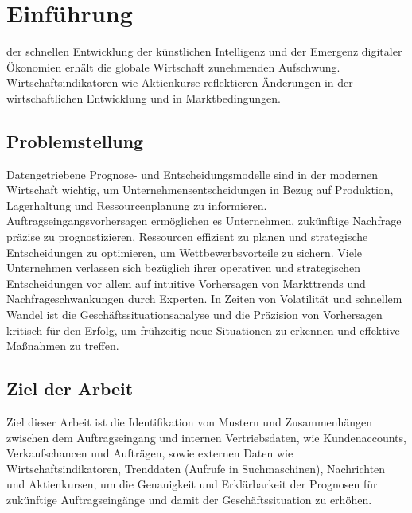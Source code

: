 \documentclass[lettersize,journal]{IEEEtran}
\begin{document}
\section{Einführung}
 der schnellen Entwicklung der künstlichen Intelligenz und der Emergenz digitaler Ökonomien erhält die globale Wirtschaft zunehmenden Aufschwung. Wirtschaftsindikatoren wie Aktienkurse reflektieren Änderungen in der wirtschaftlichen Entwicklung und in Marktbedingungen. 

\subsection*{Problemstellung}
Datengetriebene Prognose- und Entscheidungsmodelle sind in der modernen Wirtschaft wichtig, um Unternehmensentscheidungen in Bezug auf Produktion, Lagerhaltung und Ressourcenplanung zu informieren. %
Auftragseingangsvorhersagen ermöglichen es Unternehmen, zukünftige Nachfrage präzise zu prognostizieren, Ressourcen effizient zu planen und strategische Entscheidungen zu optimieren, um Wettbewerbsvorteile zu sichern. 
Viele Unternehmen verlassen sich bezüglich ihrer operativen und strategischen Entscheidungen vor allem auf intuitive Vorhersagen von Markttrends und Nachfrageschwankungen durch Experten. In Zeiten von Volatilität und schnellem Wandel ist die Geschäftssituationsanalyse und die Präzision von Vorhersagen kritisch für den Erfolg, um frühzeitig neue Situationen zu erkennen und effektive Maßnahmen zu treffen.
\subsection*{Ziel der Arbeit}
Ziel dieser Arbeit ist die Identifikation von Mustern und Zusammenhängen zwischen dem Auftragseingang und internen Vertriebsdaten, wie Kundenaccounts, Verkaufschancen und Aufträgen, sowie externen Daten wie Wirtschaftsindikatoren, Trenddaten (Aufrufe in Suchmaschinen), Nachrichten und Aktienkursen, um die Genauigkeit und Erklärbarkeit der Prognosen für zukünftige Auftragseingänge und damit der Geschäftssituation zu erhöhen.
\end{document}

